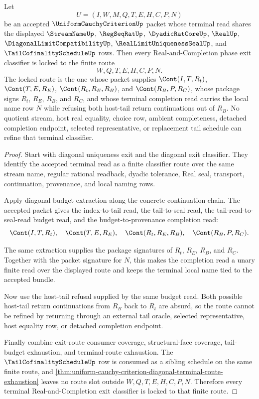 \begin{theorem}
\label{thm:uniform-cauchy-criterion-terminal-real-completion-lock}
Let
$$
U=(I,W,M,Q,T,E,H,C,P,N)
$$
be an accepted $\UniformCauchyCriterionUp$ packet whose terminal read shares the displayed $\StreamNameUp$, $\RegSeqRatUp$, $\DyadicRatCoreUp$, $\RealUp$, $\DiagonalLimitCompatibilityUp$, $\RealLimitUniquenessSealUp$, and $\TailCofinalityScheduleUp$ rows. Then every Real-and-Completion phase exit classifier is locked to the finite route
$$
W,Q,T,E,H,C,P,N.
$$
The locked route is the one whose packet supplies $\Cont(I,T,R_t)$, $\Cont(T,E,R_E)$, $\Cont(R_t,R_E,R_B)$, and $\Cont(R_B,P,R_C)$, whose package signs $R_t$, $R_E$, $R_B$, and $R_C$, and whose terminal completion read carries the local name row $N$ while refusing both host-tail return continuations out of $R_B$. No quotient stream, host real equality, choice row, ambient completeness, detached completion endpoint, selected representative, or replacement tail schedule can refine that terminal classifier.
\end{theorem}
\begin{proof}
Start with diagonal uniqueness exit and the diagonal exit classifier. They identify the accepted terminal read as a finite classifier route over the same stream name, regular rational readback, dyadic tolerance, Real seal, transport, continuation, provenance, and local naming rows.

Apply diagonal budget extraction along the concrete continuation chain. The accepted packet gives the index-to-tail read, the tail-to-seal read, the tail-read-to-seal-read budget read, and the budget-to-provenance completion read:
$$
\Cont(I,T,R_t),\quad
\Cont(T,E,R_E),\quad
\Cont(R_t,R_E,R_B),\quad
\Cont(R_B,P,R_C).
$$

The same extraction supplies the package signatures of $R_t$, $R_E$, $R_B$, and $R_C$. Together with the packet signature for $N$, this makes the completion read a unary finite read over the displayed route and keeps the terminal local name tied to the accepted bundle.

Now use the host-tail refusal supplied by the same budget read. Both possible host-tail return continuations from $R_B$ back to $R_t$ are absurd, so the route cannot be refined by returning through an external tail oracle, selected representative, host equality row, or detached completion endpoint.

Finally combine exit-route consumer coverage, structural-face coverage, tail-budget exhaustion, and terminal-route exhaustion. The $\TailCofinalityScheduleUp$ row is consumed as a sibling schedule on the same finite route, and \autoref{thm:uniform-cauchy-criterion-diagonal-terminal-route-exhaustion} leaves no route slot outside $W,Q,T,E,H,C,P,N$. Therefore every terminal Real-and-Completion exit classifier is locked to that finite route.
\end{proof}

